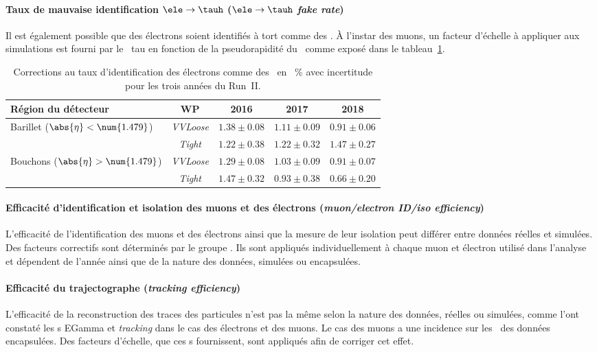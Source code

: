 \paragraph{Taux de mauvaise identification $\ele\to\tauh$ (\emph{$\ele\to\tauh$ fake rate})}
Il est également possible que des électrons soient identifiés à tort comme des \tauh.
À l'instar des muons, un facteur d'échelle à appliquer aux simulations est fourni par le \POG\ tau en fonction de la pseudorapidité du \ftauh\ comme exposé dans le tableau~\ref{tab-chapter-HTT_analysis-section-corrections-ele_to_tau_SF}.
\begin{table}[h]
\centering
\begin{tabular}{lcccc}
\toprule
Région du détecteur & WP & 2016 & 2017 & 2018 \\
\midrule
Barillet ($\abs{\eta}<\num{1.479}$) & \emph{VVLoose} & $\num{1.38}\pm\num{0.08}$ & $\num{1.11}\pm\num{0.09}$ & $\num{0.91}\pm\num{0.06}$ \\
 & \emph{Tight} & $\num{1.22}\pm\num{0.38}$ & $\num{1.22}\pm\num{0.32}$ & $\num{1.47}\pm\num{0.27}$ \\
Bouchons ($\abs{\eta}>\num{1.479}$) & \emph{VVLoose} & $\num{1.29}\pm\num{0.08}$ & $\num{1.03}\pm\num{0.09}$ & $\num{0.91}\pm\num{0.07}$ \\
 & \emph{Tight} & $\num{1.47}\pm\num{0.32}$ & $\num{0.93}\pm\num{0.38}$ & $\num{0.66}\pm\num{0.20}$ \\
\bottomrule
\end{tabular}
\caption[Corrections au taux d'identification des électrons comme des \tauh.]{Corrections au taux d'identification des électrons comme des \tauh\ en \SI{}{\%} avec incertitude pour les trois années du Run~II.}
\label{tab-chapter-HTT_analysis-section-corrections-ele_to_tau_SF}
\end{table}
\paragraph{Efficacité d'identification et isolation des muons et des électrons (\emph{muon/electron ID/iso efficiency})}
L'efficacité de l'identification des muons et des électrons ainsi que la mesure de leur isolation peut différer entre données réelles et simulées.
Des facteurs correctifs sont déterminés par le groupe \Higgs\tau\tau.
Ils sont appliqués individuellement à chaque muon et électron utilisé dans l'analyse et dépendent de l'année ainsi que de la nature des données, simulées ou encapsulées.
\paragraph{Efficacité du trajectographe (\emph{tracking efficiency})}
L'efficacité de la reconstruction des traces des particules n'est pas la même selon la nature des données, réelles ou simulées, comme l'ont constaté les \POG s EGamma et \emph{tracking} dans le cas des électrons et des muons.
Le cas des muons a une incidence sur les \tauh\ des données encapsulées.
Des facteurs d'échelle, que ces \POG s fournissent, sont appliqués afin de corriger cet effet.
